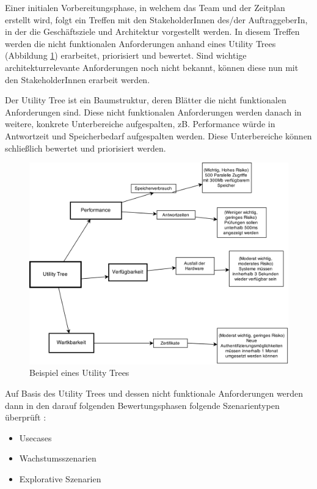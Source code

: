 Einer initialen Vorbereitungsphase, in welchem das Team und der Zeitplan erstellt wird, folgt ein Treffen mit den StakeholderInnen des/der AuftraggeberIn, in der die Geschäftsziele und Architektur vorgestellt werden. In diesem Treffen werden die nicht funktionalen Anforderungen anhand eines Utility Trees (Abbildung \ref{fig:utility}) erarbeitet, priorisiert und bewertet. Sind wichtige architekturrelevante Anforderungen noch nicht bekannt, können diese nun mit den StakeholderInnen erarbeit werden. \cite[S. 184-199]{basiswissen}

Der Utility Tree ist ein Baumstruktur, deren Blätter die nicht funktionalen Anforderungen sind. Diese nicht funktionalen Anforderungen werden danach in weitere, konkrete Unterbereiche aufgespalten, zB. Performance würde in Antwortzeit und Speicherbedarf aufgespalten werden. Diese Unterbereiche können schließlich bewertet und priorisiert werden.

\begin{figure}[H]
    \centering
    \includegraphics[scale=0.3]{img/utilitytree.png}
    \caption{Beispiel eines Utility Trees \cite[S. 17]{ATAM}}
    \label{fig:utility}
\end{figure}

Auf Basis des Utility Trees und dessen nicht funktionale Anforderungen werden dann in den darauf folgenden Bewertungsphasen folgende Szenarientypen überprüft \cite[S. 62-67]{review}\cite[S. 188]{basiswissen}:

\begin{itemize}
  \item Usecases
  \item Wachstumsszenarien
  \item Explorative Szenarien
\end{itemize}

